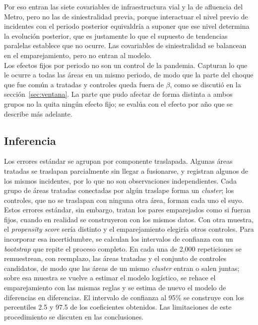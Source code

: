 Por eso entran las siete covariables de infraestructura vial y la de afluencia del Metro, pero no las de siniestralidad previa, porque interactuar el nivel previo de incidentes con el periodo posterior equivaldría a suponer que ese nivel determina la evolución posterior, que es justamente lo que el supuesto de tendencias paralelas establece que no ocurre. Las covariables de siniestralidad se balancean en el emparejamiento, pero no entran al modelo.\\

Los efectos fijos por periodo no son un control de la pandemia. Capturan lo que le ocurre a todas las áreas en un mismo periodo, de modo que la parte del choque que fue común a tratadas y controles queda fuera de $\beta$, como se discutió en la sección~\ref{sec:ventana}. La parte que pudo afectar de forma distinta a ambos grupos no la quita ningún efecto fijo; se evalúa con el efecto por año que se describe más adelante.\\

\subsection{Inferencia}
\noindent Los errores estándar se agrupan por componente traslapada. Algunas áreas tratadas se traslapan parcialmente sin llegar a fusionarse, y registran algunos de los mismos incidentes, por lo que no son observaciones independientes. Cada grupo de áreas tratadas conectadas por algún traslape forma un \emph{cluster}; los controles, que no se traslapan con ninguna otra área, forman cada uno el suyo.\\

Estos errores estándar, sin embargo, tratan los pares emparejados como si fueran fijos, cuando en realidad se construyeron con los mismos datos. Con otra muestra, el \emph{propensity score} sería distinto y el emparejamiento elegiría otros controles. Para incorporar esa incertidumbre, se calculan los intervalos de confianza con un \emph{bootstrap} que repite el proceso completo. En cada una de 2,000 repeticiones se remuestrean, con reemplazo, las áreas tratadas y el conjunto de controles candidatos, de modo que las áreas de un mismo \emph{cluster} entran o salen juntas; sobre esa muestra se vuelve a estimar el modelo logístico, se rehace el emparejamiento con las mismas reglas y se estima de nuevo el modelo de diferencias en diferencias. El intervalo de confianza al 95\% se construye con los percentiles 2.5 y 97.5 de los coeficientes obtenidos. Las limitaciones de este procedimiento se discuten en las conclusiones.\\

